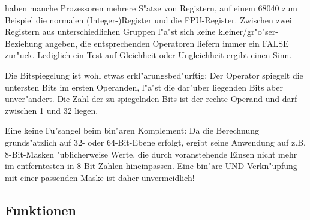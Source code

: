 \documentclass[12pt,a4paper,twoside]{report}
\begin{document}
haben manche Prozessoren mehrere S"atze von Registern, auf einem 68040
zum Beispiel die normalen (Integer-)Register und die FPU-Register.
Zwischen zwei Registern aus unterschiedlichen Gruppen l"a"st sich
keine kleiner/gr"o"ser-Beziehung angeben, die entsprechenden Operatoren
liefern immer ein FALSE zur"uck.  Lediglich ein Test auf Gleichheit oder
Ungleichheit ergibt einen Sinn.
\par
Die Bitspiegelung ist wohl etwas erkl"arungsbed"urftig: Der Operator
spiegelt die untersten Bits im ersten Operanden, l"a"st die
dar"uber liegenden Bits aber unver"andert.  Die Zahl der zu spiegelnden
Bits ist der rechte Operand und darf zwischen 1 und 32 liegen.
\par
Eine keine Fu"sangel beim bin"aren Komplement: Da die Berechnung
grunds"atzlich auf 32- oder 64-Bit-Ebene erfolgt, ergibt seine Anwendung
auf z.B. 8-Bit-Masken "ublicherweise Werte, die durch voranstehende
Einsen nicht mehr im entferntesten in 8-Bit-Zahlen hineinpassen.  Eine
bin"are UND-Verkn"upfung mit einer passenden Maske ist daher unvermeidlich!

\subsection{Funktionen}
\end{document}
